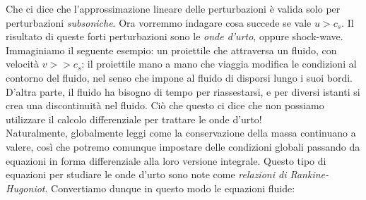 \documentclass{report}
\begin{document}
Che ci dice che l'approssimazione lineare delle perturbazioni è valida solo per perturbazioni \emph{subsoniche}. Ora vorremmo indagare cosa succede se vale $u> c_s$. Il risultato di queste forti perturbazioni sono le \emph{onde d'urto}, oppure shock-wave. \\

Immaginiamo il seguente esempio: un proiettile che attraversa un fluido, con velocità $v >> c_s$: il proiettile mano a mano che viaggia modifica le condizioni al contorno del fluido, nel senso che impone al fluido di disporsi lungo i suoi bordi. D'altra parte, il fluido ha bisogno di tempo per riassestarsi, e per diversi istanti si crea una discontinuità nel fluido. Ciò che questo ci dice che non possiamo utilizzare il calcolo differenziale per trattare le onde d'urto! \\

Naturalmente, globalmente leggi come la conservazione della massa continuano a valere, così che potremo comunque impostare delle condizioni globali passando da equazioni in forma differenziale alla loro versione integrale. Questo tipo di equazioni per studiare le onde d'urto sono note come \emph{relazioni di Rankine-Hugoniot}. Convertiamo dunque in questo modo le equazioni fluide: 
\end{document}
